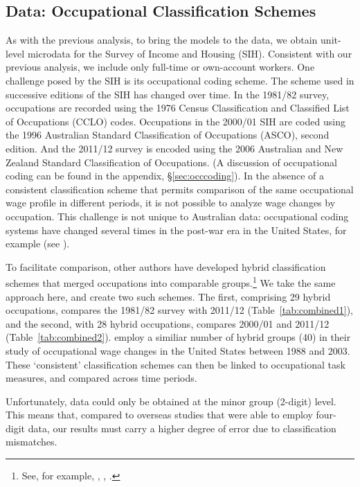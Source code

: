 \subsection{Data: Occupational Classification Schemes}

As with the previous analysis, to bring the models to the data, we obtain unit-level microdata for the Survey of Income and Housing (SIH). Consistent with our previous analysis, we include only full-time or own-account workers. One challenge posed by the SIH is its occupational coding scheme. The  scheme used in successive editions of the SIH has changed over time. In the 1981/82 survey, occupations are recorded using the 1976 Census Classification and Classified List of Occupations (CCLO) codes. Occupations in the 2000/01 SIH are coded using the 1996 Australian Standard Classification of Occupations (ASCO), second edition. And the 2011/12 survey is encoded using the 2006 Australian and New Zealand Standard Classification of Occupations. (A discussion of occupational coding can be found in the appendix, \S\ref{sec:occcoding}). In the absence of a consistent classification scheme that permits comparison of the same occupational wage profile in different periods, it is not possible to analyze wage changes by occupation. This challenge is not unique to Australian data: occupational coding systems have changed several times in the post-war era in the United States, for example (see \cite{Autor2012,Meyer2005}).

To facilitate comparison, other authors have developed hybrid classification schemes that merged occupations into comparable groups.\footnote{See, for example, \citet{Levy2003}, \citet{Fortin2011}, \citet{Acemoglu2011}.} We take the same approach here, and create two such schemes. The first, comprising 29 hybrid occupations, compares the 1981/82 survey with 2011/12 (Table~\ref{tab:combined1}), and the second, with 28 hybrid occupations, compares 2000/01 and 2011/12 (Table~\ref{tab:combined2}). \citet{Firpo2011} employ a similiar number of hybrid groups (40) in their study of occupational wage changes in the United States between 1988 and 2003. These `consistent' classification schemes can then be linked to occupational task measures, and compared across time periods.

Unfortunately, data could only be obtained at the minor group (2-digit) level. This means that, compared to overseas studies that were able to employ four-digit data, our results must carry a higher degree of error due to classification mismatches.

